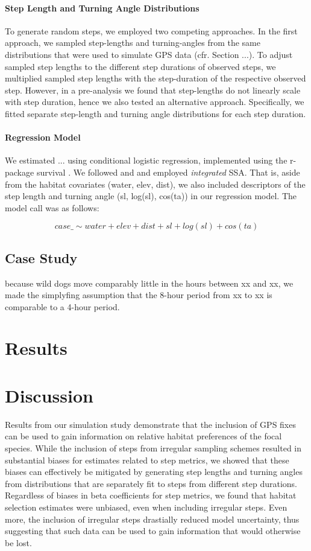\documentclass[abstract=on,10pt,a4paper,bibliography=totocnumbered]{article}
\begin{document}
\paragraph{Step Length and Turning Angle Distributions}
To generate random steps, we employed two competing approaches. In the first
approach, we sampled step-lengths and turning-angles from the same distributions
that were used to simulate GPS data (cfr. Section ...). To adjust sampled step
lengths to the different step durations of observed steps, we multiplied sampled
step lengths with the step-duration of the respective observed step. However, in
a pre-analysis we found that step-lengths do not linearly scale with step
duration, hence we also tested an alternative approach. Specifically, we fitted
separate step-length and turning angle distributions for each step duration.

\paragraph{Regression Model}
We estimated ... using conditional logistic regression, implemented using the
r-package \textsf{survival} \citep{Therneau.2021}. We followed \cite{Avgar.2016}
and \cite{Fieberg.2021} and employed \textit{integrated} SSA. That is, aside
from the habitat covariates (\textsf{water, elev, dist}), we also included
descriptors of the step length and turning angle (\textsf{sl, log(sl), cos(ta)})
in our regression model. The model call was as follows:

$$
case\_ \sim water + elev + dist + sl + log(sl) + cos(ta)
$$

\subsection{Case Study}

because wild dogs move comparably little in the hours between xx and xx, we made
the simplyfing assumption that the 8-hour period from xx to xx is comparable to
a 4-hour period.


\section{Results}
\section{Discussion}
Results from our simulation study demonstrate that the inclusion of GPS fixes
can be used to gain information on relative habitat preferences of the focal
species. While the inclusion of steps from irregular sampling schemes resulted
in substantial biases for estimates related to step metrics, we showed that
these biases can effectively be mitigated by generating step lengths and turning
angles from distributions that are separately fit to steps from different step
durations. Regardless of biases in beta coefficients for step metrics, we found
that habitat selection estimates were unbiased, even when including irregular
steps. Even more, the inclusion of irregular steps drastially reduced model
uncertainty, thus suggesting that such data can be used to gain information that
would otherwise be lost.
\end{document}
